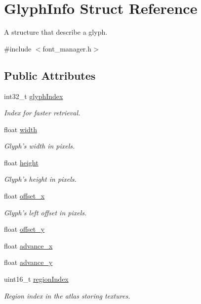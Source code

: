 \hypertarget{struct_glyph_info}{\section{Glyph\+Info Struct Reference}
\label{struct_glyph_info}
}


A structure that describe a glyph.  




{\ttfamily \#include $<$font\+\_\+manager.\+h$>$}

\subsection*{Public Attributes}
\begin{DoxyCompactItemize}
\item 
int32\+\_\+t \hyperlink{struct_glyph_info_ab597d9409c28f3e07b2d7158646faa3c}{glyph\+Index}
\begin{DoxyCompactList}\small\item\em Index for faster retrieval. \end{DoxyCompactList}\item 
float \hyperlink{struct_glyph_info_af8f1393ec498cdabefbaf08f77b62cbd}{width}
\begin{DoxyCompactList}\small\item\em Glyph's width in pixels. \end{DoxyCompactList}\item 
float \hyperlink{struct_glyph_info_a573a4ed41d755a152d2949d02a22449c}{height}
\begin{DoxyCompactList}\small\item\em Glyph's height in pixels. \end{DoxyCompactList}\item 
float \hyperlink{struct_glyph_info_af7c352469c5fa93aad86a5681fd21561}{offset\+\_\+x}
\begin{DoxyCompactList}\small\item\em Glyph's left offset in pixels. \end{DoxyCompactList}\item 
float \hyperlink{struct_glyph_info_a0a4e24fed8ccb6af8efd08ee8b58d465}{offset\+\_\+y}
\item 
float \hyperlink{struct_glyph_info_ac7542ec73906552cf31d9b4ce0749d0c}{advance\+\_\+x}
\item 
float \hyperlink{struct_glyph_info_a30498d3b9435d104130fcfd2829d2817}{advance\+\_\+y}
\item 
uint16\+\_\+t \hyperlink{struct_glyph_info_a82c347997a66291d8d4aaa7db764d4e2}{region\+Index}
\begin{DoxyCompactList}\small\item\em Region index in the atlas storing textures. \end{DoxyCompactList}\end{DoxyCompactItemize}


